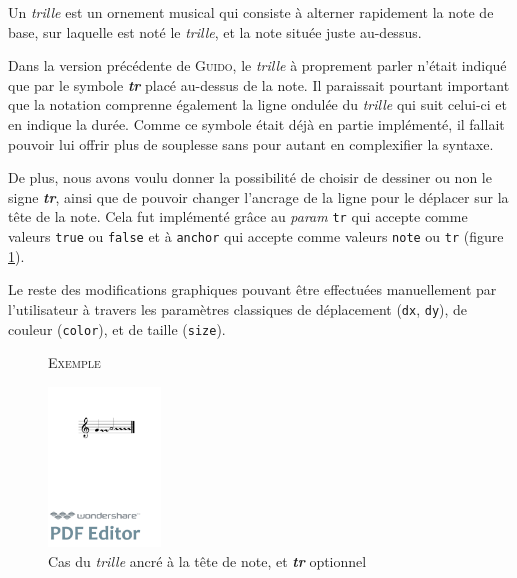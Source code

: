 \documentclass{article}
\newenvironment{gmncode}	{\vspace{-2mm}\small\verbatim}{\endverbatim\vspace{-2mm}}
\newcommand{\guido}			{\textsc{Guido}}
\newcommand{\code}[1]		{{\small \texttt{#1}}}
\newcommand{\exemple}		{\vspace{2mm}\hspace*{-3mm}\textsc{Exemple}}
\begin{document}
Un \emph{trille} est un ornement musical qui consiste à alterner rapidement la note de base, sur laquelle est noté le \emph{trille}, et la note située juste au-dessus.

Dans la version précédente de \guido{}, le \emph{trille} à proprement parler n'était indiqué que par le symbole \textit{\textbf{tr}} placé au-dessus de la note. Il paraissait pourtant important que la notation comprenne également la ligne ondulée du \emph{trille} qui suit celui-ci et en indique la durée. Comme ce symbole était déjà en partie implémenté, il fallait pouvoir lui offrir plus de souplesse sans pour autant en complexifier la syntaxe.


De plus, nous avons voulu donner la possibilité de choisir de dessiner ou non le signe \textit{\textbf{tr}}, ainsi que de pouvoir changer l'ancrage de la ligne pour le déplacer sur la tête de la note. Cela fut implémenté grâce au \emph{param} \code{tr} qui accepte comme valeurs \code{true} ou \code{false} et à \code{anchor} qui accepte comme valeurs \code{note} ou \code{tr} (figure \ref{fig:trillanchor}). 

Le reste des modifications graphiques pouvant être effectuées manuellement par l'utilisateur à travers les paramètres classiques de déplacement (\code{dx}, \code{dy}), de couleur (\code{color}), et de taille (\code{size}).


\begin{figure}[h]
\exemple
\begin{center}
\begin{gmncode}
[ \trill<tr="false", anchor="note">
  ( {g} {a/2} ) ]
\end{gmncode}
\includegraphics[width=30mm]{img/trillanchor.pdf}
\end{center}
\caption{Cas du \emph{trille} ancré à la tête de note, et \textit{\textbf{tr}} optionnel}
\label{fig:trillanchor}
\end{figure}
\end{document}
